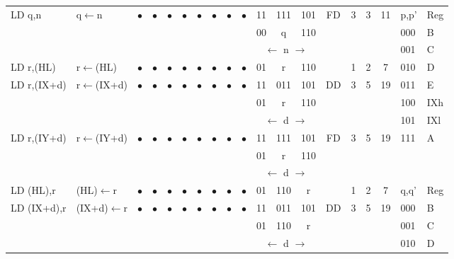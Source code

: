 \documentclass[oneside,a4paper]{book}
\begin{document}
{\begin{tabular}{llc@{ }c@{ }c@{ }c@{ }c@{ }c@{ }c@{ }cc@{ }c@{ }cccccll}
LD q,n	& q$\leftarrow$n & 
	$\bullet$ & $\bullet$ & $\bullet$ & $\bullet$ & $\bullet$ & $\bullet$ & $\bullet$ & $\bullet$ & 11 & 111 & 101
	& FD & 3 & 3 & 11 & p,p' & Reg \\ \cline{18-19}
\multicolumn{10}{c}{} & 00 & q & 110 & \multicolumn{4}{c}{} & 000 & B \\
\multicolumn{10}{c}{} & \multicolumn{3}{c}{$\leftarrow$ n $\rightarrow$} & \multicolumn{4}{c}{} & 001 & C\\

LD r,(HL) & r$\leftarrow$(HL) & 
	$\bullet$ & $\bullet$ & $\bullet$ & $\bullet$ & $\bullet$ & $\bullet$ & $\bullet$ & $\bullet$ & 01 & r & 110
	& & 1 & 2 & 7 & 010 & D \\

LD r,(IX+d) & r$\leftarrow$(IX+d) & 
	$\bullet$ & $\bullet$ & $\bullet$ & $\bullet$ & $\bullet$ & $\bullet$ & $\bullet$ & $\bullet$ & 11 & 011 & 101
	& DD & 3 & 5 & 19 & 011 & E \\
\multicolumn{10}{c}{} & 01 & r & 110 & \multicolumn{4}{c}{} & 100 & IXh \\
\multicolumn{10}{c}{} & \multicolumn{3}{c}{$\leftarrow$ d $\rightarrow$} & \multicolumn{4}{c}{} & 101 & IXl\\

LD r,(IY+d) & r$\leftarrow$(IY+d) & 
	$\bullet$ & $\bullet$ & $\bullet$ & $\bullet$ & $\bullet$ & $\bullet$ & $\bullet$ & $\bullet$ & 11 & 111 & 101
	& FD & 3 & 5 & 19 & 111 & A \\
\multicolumn{10}{c}{} & 01 & r & 110 & \multicolumn{4}{c}{} & & \\
\multicolumn{10}{c}{} & \multicolumn{3}{c}{$\leftarrow$ d $\rightarrow$} & \multicolumn{4}{c}{} & & \\

LD (HL),r & (HL)$\leftarrow$r & 
	$\bullet$ & $\bullet$ & $\bullet$ & $\bullet$ & $\bullet$ & $\bullet$ & $\bullet$ & $\bullet$ & 01 & 110 & r
	& & 1 & 2 & 7 & q,q' & Reg \\ \cline{18-19}

LD (IX+d),r & (IX+d)$\leftarrow$r & 
	$\bullet$ & $\bullet$ & $\bullet$ & $\bullet$ & $\bullet$ & $\bullet$ & $\bullet$ & $\bullet$ & 11 & 011 & 101
	& DD & 3 & 5 & 19 & 000 & B \\
\multicolumn{10}{c}{} & 01 & 110 & r & \multicolumn{4}{c}{} & 001 & C \\
\multicolumn{10}{c}{} & \multicolumn{3}{c}{$\leftarrow$ d $\rightarrow$} & \multicolumn{4}{c}{} & 010 & D \\


\end{tabular}}
\end{document}
